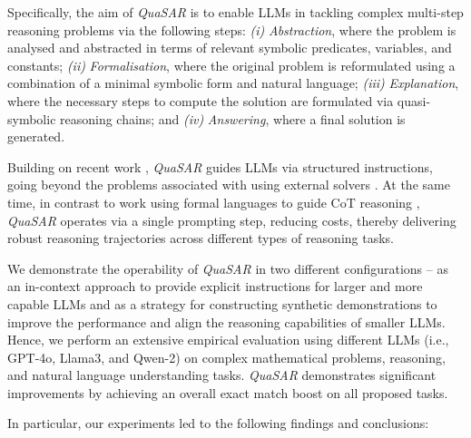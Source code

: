 \documentclass[11pt]{article}
\newcommand{\QuaSAR}{\emph{QuaSAR}\xspace}
\begin{document}
Specifically, the aim of \QuaSAR is to enable LLMs in tackling complex multi-step reasoning problems via the following steps: \textit{(i)} \textit{Abstraction}, where the problem is analysed and abstracted in terms of relevant symbolic predicates, variables, and constants; \textit{(ii)} \textit{Formalisation}, where the original problem is reformulated using a combination of a minimal symbolic form and natural language; \textit{(iii)} \textit{Explanation}, where the necessary steps to compute the solution are formulated via quasi-symbolic reasoning chains; and \textit{(iv)} \textit{Answering}, where a final solution is generated. 


Building on recent work \cite{lyu2023faithful,jiang2024leanreasoner}, 
\QuaSAR guides LLMs via structured instructions, going beyond the problems associated with using external solvers \cite{quan2024verificationrefinementnaturallanguage}. At the same time, in contrast to work using formal languages to guide CoT reasoning \cite{leang2024comatchainmathematicallyannotated,arakelyan2024flarefaithfullogicaidedreasoning}, \QuaSAR operates via a single prompting step, reducing costs, thereby delivering robust reasoning trajectories across different types of reasoning tasks.

We demonstrate the operability of \QuaSAR in two different configurations -- as an in-context approach to provide explicit instructions for larger and more capable LLMs and as a strategy for constructing synthetic demonstrations to improve the performance and align the reasoning capabilities of smaller LLMs. Hence, we perform an extensive empirical evaluation using different LLMs (i.e., GPT-4o, Llama3, and Qwen-2) on complex mathematical problems, reasoning, and natural language understanding tasks. \QuaSAR demonstrates significant improvements by achieving an overall exact match boost on all proposed tasks.

In particular, our experiments led to the following findings and conclusions: 
\end{document}
